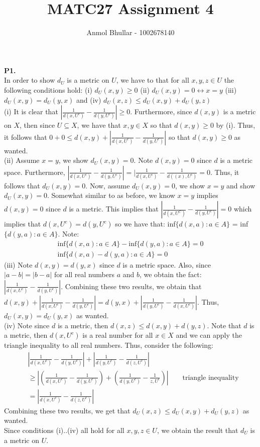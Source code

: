 \documentclass{article}
\title{MATC27 Assignment 4}
\author{Anmol Bhullar - 1002678140}
\begin{document}
    \maketitle
    \textbf{P1.}\\ 
    In order to show $d_U$ is a metric on $U$, we have to that for all $x,y,z\in U$ the following conditions hold: (i) $d_U(x,y)\geq 0$ (ii) $d_U(x,y)=0
    \leftrightarrow x=y$ (iii) $d_U(x,y)=d_U(y,x)$ and (iv) $d_U(x,z)\leq d_U(x,y)+d_U(y,z)$\\
    (i) It is clear that $|\frac{1}{d(x,U^c)} - \frac{1}{d(y,U^c)}|\geq 0$. Furthermore, since $d(x,y)$ is a metric on $X$, then since $U\subseteq X$,
    we have that $x,y\in X$ so that $d(x,y)\geq 0$ by (i). Thus, it follows that $0 + 0 \leq d(x,y) + |\frac{1}{d(x,U^c)}-\frac{1}{d(y,U^c)}|$
    so that $d(x,y)\geq 0$ as wanted.\\
    (ii) Assume $x=y$, we show $d_U(x,y)=0$. Note $d(x,y)=0$ since $d$ is a metric space. Furthermore, $|\frac{1}{d(x,U^c)}-\frac{1}{d(y,U^c)}| = 
    |\frac{1}{d(x,U^c)} - \frac{1}{d((x),U^c)} = 0$. Thus, it follows that $d_U(x,y) = 0$. Now, assume $d_U(x,y)=0$, we show $x=y$ and show $d_U(x,y)=0$.
    Somewhat similar to as before, we know $x=y$ implies $d(x,y)=0$ since $d$ is a metric. This implies that $|\frac{1}{d(x,U^C)}-\frac{1}{d(y,U^c)}|=0$
    which implies that $d(x,U^c)=d(y,U^c)$ so we have that: inf$\{d(x,a):a\in A\}$ = inf$\{d(y,a):a\in A\}$. Note:
    \begin{align*}
        \text{inf}\{d(x,a): a\in A\} - \text{inf}\{d(y,a): a\in A\} = 0 \\
        \text{inf}\{d(x,a) - d(y,a): a\in A\} = 0
    \end{align*}
    (iii) Note $d(x,y) = d(y,x)$ since $d$ is a metric space. Also, since $|a-b| = |b-a|$ for all real numbers $a$ and $b$, we obtain the fact:
    $|\frac{1}{d(x,U^c)} - \frac{1}{d(y,U^c)}|$. Combining these two results, we obtain that $d(x,y) + |\frac{1}{d(x,U^c)} - \frac{1}{d(y,U^c)}| = d(y,x) +
    |\frac{1}{d(y,U^c)} - \frac{1}{d(x,U^c)}|$. Thus, $d_U(x,y) = d_U(y,x)$ as wanted.\\
    (iv) Note since $d$ is a metric, then $d(x,z)\leq d(x,y) + d(y,z)$. Note that $d$ is a metric, then $d(x,U^c)$ is a real number for
    all $x\in X$ and we can apply the triangle inequality to all real numbers. Thus, consider the following:
    \begin{align*}
        &|\frac{1}{d(x,U^c)} - \frac{1}{d(y,U^c)}| + |\frac{1}{d(y,U^c)} - \frac{1}{d(z,U^c)}| \\
        &\geq |(\frac{1}{d(x,U^c)} - \frac{1}{d(y,U^c)}) + (\frac{1}{d(y,U^c)} - \frac{1}{z,U^c})|\qquad\text{triangle inequality}\\
        &= |\frac{1}{d(x,U^c)} - \frac{1}{d(z,U^c)}|
    \end{align*}
    Combining these two results, we get that $d_U(x,z)\leq d_U(x,y)+d_U(y,z)$ as wanted.\\
    Since conditions (i)..(iv) all hold for all $x,y,z\in U$, we obtain the result that $d_U$ is a metric on $U$.\\
\end{document}
